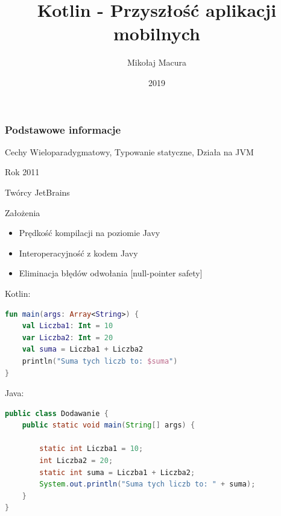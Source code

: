 \documentclass{beamer}
\title[Kotlin]{Kotlin - Przyszłość aplikacji mobilnych}
\author{Mikołaj Macura}
\institute{RMS}
\date{2019}
\begin{document}
\frame{\titlepage}


\begin{frame}
\frametitle{Podstawowe informacje}

\begin{block}{Cechy}
Wieloparadygmatowy, Typowanie statyczne, Działa na JVM
\end{block}

\begin{block}{Rok}
2011
\end{block}

\begin{block}{Twórcy}
JetBrains
\end{block}

\begin{block}{Założenia}

\begin{itemize}
\item Prędkość kompilacji na poziomie Javy
\item Interoperacyjność z kodem Javy
\item Eliminacja błędów odwołania [null-pointer safety]
\end{itemize}
\end{block}
\end{frame}


\begin{frame}[fragile]

Kotlin:
\begin{lstlisting}[label={lst:example1}, language=Kotlin]
fun main(args: Array<String>) {
    val Liczba1: Int = 10
    var Liczba2: Int = 20
    val suma = Liczba1 + Liczba2
    println("Suma tych liczb to: $suma")
}
\end{lstlisting}

Java:
\begin{lstlisting}[label={lst:example2}, language=Java]
public class Dodawanie {
    public static void main(String[] args) {
        
        static int Liczba1 = 10;
        int Liczba2 = 20;
        static int suma = Liczba1 + Liczba2;
        System.out.println("Suma tych liczb to: " + suma);
    }
}
\end{lstlisting}
\end{frame}

\end{document}
